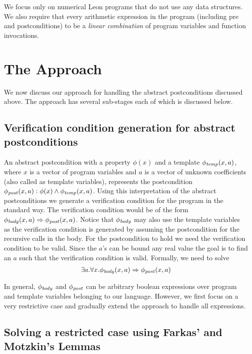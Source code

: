\documentclass[a4paper,10pt]{article}
\begin{document}
We focus only on numerical Leon programs that do not use any data structures. We also require that every arithmetic expression in the program (including pre and postconditions) to be a \emph{linear combination} of program variables and function invocations.

\section{The Approach}

We now discuss our approach for handling the abstract postconditions discussed above.
The approach has several sub-stages each of which is discussed below.

\subsection{Verification condition generation for abstract postconditions}

An abstract postcondition with a property $\phi(x)$ and a template $\mathit{\phi_{temp}}(x,a)$,
where $x$ is a vector of program variables and $a$ is a vector of unknown coefficients (also called as template variables),
represents the postcondition $\mathit{\phi_{post}}(x,a): \phi(x) \wedge \mathit{\phi_{temp}}(x,a)$.
Using this interpretation of the abstract postconditions we generate a verification condition 
for the program in the standard way. 
The verification condition would be of the form $\mathit{\phi_{body}}(x,a) \Rightarrow \mathit{\phi_{post}}(x,a)$. Notice that $\mathit{\phi_{body}}$ may also use the template variables as the verification condition is generated by assuming the postcondition for the recursive calls in the body.
For the postcondition to hold we need the verification condition to be valid. Since the $a$'s can be bound any real value the goal is to find an $a$ such that the verification condition is valid. Formally, we need to solve
%
\begin{align}
\exists a. \forall x. \mathit{\phi_{body}}(x,a) \Rightarrow \mathit{\phi_{post}}(x,a)
\label{eq:tempvc}
\end{align}

In general, $\mathit{\phi_{body}}$ and $\mathit{\phi_{post}}$ can be arbitrary boolean expressions over program and template variables belonging to our language. However, we first focus on a very restrictive case and gradually extend the approach to handle all expressions.

\subsection{Solving a restricted case using Farkas' and Motzkin's Lemmas}
\end{document}
